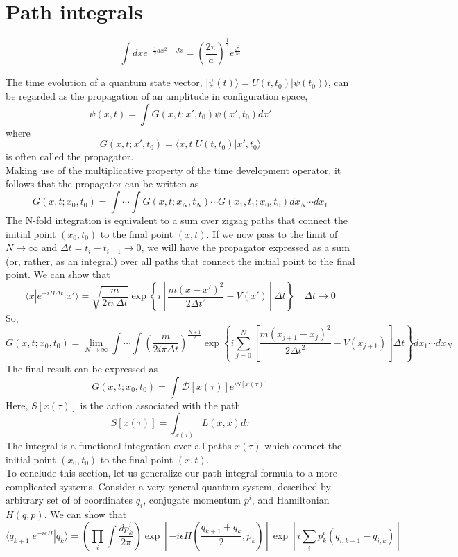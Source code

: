 \section{Path integrals}
\begin{newthem}
\[\int dx e^{-\frac{1}{2} ax^2 + Jx} = \left( \frac{2\pi}{a}\right)^{\frac{1}{2}} e^{\frac{J^2}{2a}}\]
\end{newthem}
The time evolution of a quantum state vector, $|\psi(t)\rangle = U(t,t_0)| \psi(t_0)\rangle$, can be regarded as the propagation of an amplitude in configuration space,
\[\psi(x,t) = \int G(x,t;x',t_0) \psi(x',t_0)dx'\]
where
\[G(x,t;x',t_0) = \langle x,t | U(t,t_0) | x',t_0 \rangle\]
is often called the propagator. \\
Making use of the multiplicative property of the time development operator, it follows that the propagator can be written as
\[G(x,t;x_0,t_0) = \int \cdots \int G(x,t;x_N,t_N) \cdots G(x_1,t_1;x_0,t_0) dx_N \cdots dx_1\]
The N-fold integration is equivalent to a sum over zigzag paths that connect the initial point $(x_0,t_0)$ to the final point $(x,t)$. If we now pass to the limit of $N \to \infty$ and $\Delta t = t_i - t_{i-1} \to 0$, we will have the propagator expressed as a sum (or, rather, as an integral) over all paths
that connect the initial point to the final point.
We can show that
\[\langle x | e^{-iH \Delta t} | x' \rangle = \sqrt{\frac{m}{2i\pi\Delta t}} \exp \left\{ i\left[ \frac{m(x-x')^2}{2\Delta t^2}   -V(x') \right] \Delta t \right\} \quad \Delta t \to 0 \]
So,
\[G(x,t;x_0,t_0) = \lim_{N \to \infty} \int \cdots \int \left(\frac{m}{2i\pi\Delta t}\right)^{\frac{N+1}{2}} \exp \left\{ i \sum_{j=0}^{N}\left[ \frac{m(x_{j+1}-x_{j})^2}{2\Delta t^2}   -V(x_{j+1}) \right] \Delta t \right\} dx_1 \cdots dx_N\]
The final result can be expressed as
\[G(x,t;x_0,t_0) = \int \mathcal{D}[x(\tau)] e^{iS[x(\tau)]}\]
Here, $S[x(\tau)]$ is the action associated with the path
\[S[x(\tau)] = \int_{x(\tau)} L(x,\dot{x}) d\tau\]
The integral is a functional integration over all paths $x(\tau)$ which connect the initial point $(x_0,t_0)$ to the final point $(x,t)$.\\
To conclude this section, let us generalize our path-integral formula to a more complicated systems. Consider a very general quantum system, described by arbitrary set of of coordinates $q_i$, conjugate momentum $p^i$, and Hamiltonian $H(q,p)$. 
We can show that
\[\langle q_{k+1} | e^{-i\epsilon H} | q_{k}\rangle = \left( \prod_i \int \frac{dp^i_k}{2\pi}\right) \exp \left[ -i\epsilon H \left( \frac{q_{k+1}+q_{k}}{2},p_k\right) \right] \exp \left[ i \sum_i p_k^i (q_{i,k+1} - q_{i,k})\right] \] 
